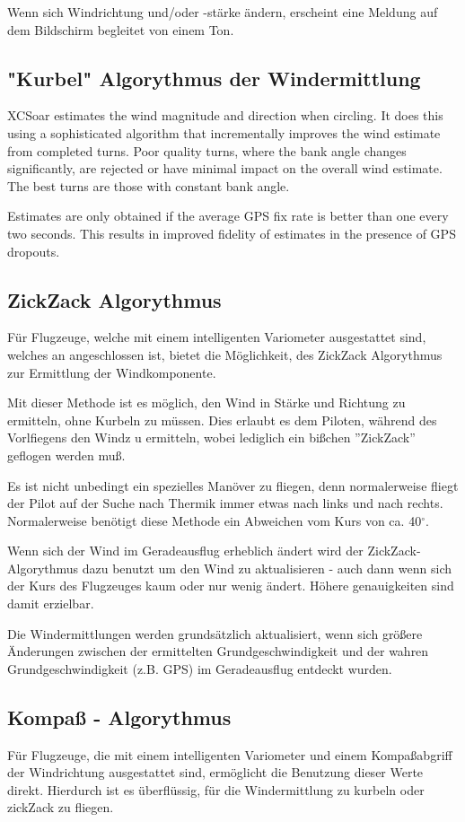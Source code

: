 Wenn sich Windrichtung und/oder -stärke ändern, erscheint eine Meldung  auf dem Bildschirm begleitet von einem Ton.
\subsection*{"Kurbel" Algorythmus der Windermittlung}
XCSoar estimates the wind magnitude and direction when circling.  It
does this using a sophisticated algorithm that incrementally improves
the wind estimate from completed turns.  Poor quality turns, where
the bank angle changes significantly, are rejected or have minimal
impact on the overall wind estimate.  The best turns are those with
constant bank angle.

Estimates are only obtained if the average GPS fix rate is better than
one every two seconds.  This results in improved fidelity of estimates
in the presence of GPS dropouts.
\subsection*{ZickZack Algorythmus}
Für Flugzeuge, welche mit einem intelligenten Variometer ausgestattet sind, welches
an \xc angeschlossen ist, bietet \xc die Möglichkeit, des ZickZack Algorythmus
zur Ermittlung der Windkomponente.

Mit dieser Methode ist es möglich, den Wind in Stärke und Richtung zu ermitteln, ohne Kurbeln zu müssen.
Dies erlaubt es dem Piloten,  während des Vorlfiegens den Windz u ermitteln, wobei lediglich ein
bißchen ''ZickZack'' geflogen werden muß.

Es ist nicht unbedingt ein spezielles Manöver zu fliegen, denn normalerweise  fliegt der Pilot auf
der Suche nach Thermik immer etwas nach links und nach rechts. Normalerweise benötigt diese
Methode ein Abweichen vom Kurs von ca. 40$^\circ$.

Wenn sich der Wind im Geradeausflug erheblich ändert wird der ZickZack-Algorythmus dazu benutzt
um den Wind zu aktualisieren - auch dann wenn sich der Kurs des Flugzeuges kaum oder nur wenig ändert.
Höhere genauigkeiten sind damit erzielbar.

Die Windermittlungen werden grundsätzlich aktualisiert, wenn sich größere Änderungen zwischen  der
ermittelten Grundgeschwindigkeit und der wahren Grundgeschwindigkeit (z.B. GPS)
im Geradeausflug entdeckt wurden.
\subsection*{Kompaß - Algorythmus}
Für Flugzeuge, die mit einem intelligenten Variometer und einem Kompaßabgriff der
Windrichtung ausgestattet sind, ermöglicht  \xc die Benutzung dieser Werte direkt.
Hierdurch ist es überflüssig, für die Windermittlung zu kurbeln oder zickZack zu fliegen.
